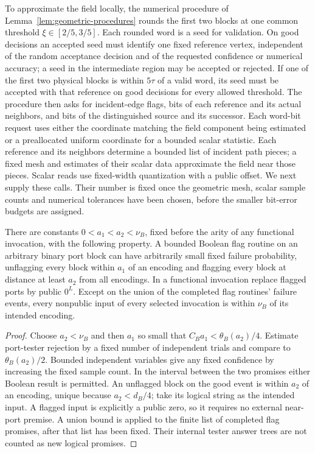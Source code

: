 To approximate the field locally, the numerical procedure of
Lemma~\ref{lem:geometric-procedures} rounds the first two blocks at one
common threshold $\xi\in[2/5,3/5]$. Each rounded word is a seed for
validation. On good decisions an accepted seed must identify one fixed
reference vertex, independent of the random acceptance decision and of
the requested confidence or numerical accuracy; a seed in the intermediate
region may be accepted or rejected. If one of the first two physical
blocks is within $5\tau$ of a valid word, its seed must be accepted with that
reference on good decisions for every allowed threshold. The procedure
then asks for incident-edge flags, bits of each reference and its actual neighbors,
and bits of the distinguished source and its successor. Each word-bit
request uses either the coordinate matching the field component being
estimated or a preallocated uniform coordinate for a bounded scalar
statistic. Each reference and its neighbors determine a bounded list of
incident path pieces; a fixed mesh and estimates of their scalar data
approximate the field near those pieces. Scalar reads use fixed-width
quantization with a public offset. We next supply these calls. Their
number is fixed once the geometric mesh, scalar sample counts and
numerical tolerances have been chosen, before the smaller bit-error
budgets are assigned.

\begin{lemma}\label{out:flags}
There are constants $0<a_1<a_2<\nu_B$, fixed before the arity of any
functional invocation, with the following property. A bounded Boolean
flag routine on an arbitrary binary port block can have arbitrarily
small fixed failure probability, unflagging every block within $a_1$ of
an encoding and flagging every block at distance at least $a_2$ from all
encodings. In a functional invocation replace flagged ports by public
$0^L$. Except on the union of the completed flag routines' failure
events, every nonpublic input of every selected invocation is within
$\nu_B$ of its intended encoding.
\end{lemma}
\begin{proof}
Choose $a_2<\nu_B$ and then $a_1$ so small that
$C_Ba_1<\theta_B(a_2)/4$. Estimate port-tester rejection by a fixed
number of independent trials and compare to $\theta_B(a_2)/2$.
Bounded independent variables give any fixed confidence by increasing
the fixed sample count. In the interval between the two promises either
Boolean result is permitted. An unflagged block on the good event is
within $a_2$ of an encoding, unique because $a_2<d_B/4$; take its logical
string as the intended input. A flagged input is explicitly a public
zero, so it requires no external near-port premise. A union bound is
applied to the finite list of completed flag promises, after that list
has been fixed. Their internal tester answer trees are not counted as
new logical promises.
\end{proof}

